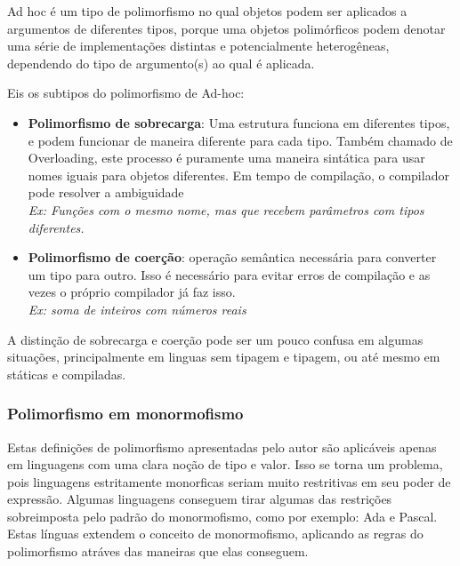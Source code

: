 \documentclass[12pt]{article}
\begin{document}
        Ad hoc é um tipo de polimorfismo no qual objetos podem ser aplicados a argumentos de diferentes 
        tipos, porque uma objetos polimórficos podem denotar uma série de implementações distintas e potencialmente heterogêneas, dependendo
        do tipo de argumento(s) ao qual é aplicada.

        Eis os subtipos do polimorfismo de Ad-hoc:

        \begin{itemize}
            \item \textbf{Polimorfismo de sobrecarga}: Uma estrutura funciona em diferentes tipos, e podem funcionar de maneira diferente para 
            cada tipo. Também chamado de Overloading, este processo é puramente uma maneira sintática para usar nomes iguais para objetos diferentes.
            Em tempo de compilação, o compilador pode resolver a ambiguidade\\ \emph{Ex: Funções com o mesmo nome, mas que recebem parâmetros com tipos diferentes.}
            \item \textbf{Polimorfismo de coerção}: operação semântica necessária para converter um tipo  
            para outro. Isso é necessário para evitar erros de compilação e as vezes o próprio compilador 
            já faz isso. \\ \emph{Ex: soma de inteiros com números reais}
        \end{itemize}

        A distinção de sobrecarga e coerção pode ser um pouco confusa em algumas situações, principalmente
        em linguas sem tipagem e tipagem, ou até mesmo em státicas e compiladas. 

        \subsubsection{Polimorfismo em monormofismo}

        Estas definições de polimorfismo apresentadas pelo autor são aplicáveis 
        apenas em linguagens com uma clara noção de tipo e valor. Isso se torna um 
        problema, pois linguagens estritamente monorficas seriam muito restritivas
        em seu poder de expressão. Algumas linguagens conseguem tirar algumas das 
        restrições sobreimposta pelo padrão do monormofismo, como por exemplo: Ada e 
        Pascal. Estas línguas extendem o conceito de monormofismo, aplicando as regras  
        do polimorfismo atráves das maneiras que elas conseguem.
\end{document}
